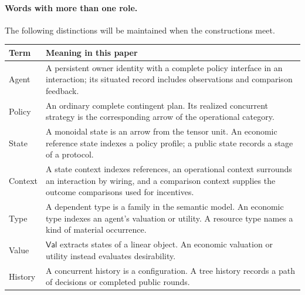 \documentclass[11pt,a4paper]{article}
\numberwithin{equation}{section}
\theoremstyle{definition}
\theoremstyle{remark}
\theoremstyle{plain}
\begin{document}
\paragraph{Words with more than one role.}
The following distinctions will be maintained when the constructions meet.
\begin{center}
\begin{tabular}{@{}p{}p{}@{}}
\toprule
Term & Meaning in this paper\\
\midrule
Agent & A persistent owner identity with a complete policy interface in an
interaction; its situated record includes observations and comparison feedback.\\
Policy & An ordinary complete contingent plan. Its realized concurrent strategy
is the corresponding arrow of the operational category.\\
State & A monoidal state is an arrow from the tensor unit.
An economic reference state indexes a policy profile; a public state
records a stage of a protocol.\\
Context & A state context indexes references, an operational context
surrounds an interaction by wiring, and a comparison context supplies
the outcome comparisons used for incentives.\\
Type & A dependent type is a family in the semantic model.
An economic type indexes an agent's valuation or utility.
A resource type names a kind of material occurrence.\\
Value & $\mathsf{Val}$ extracts states of a linear object.
An economic valuation or utility instead evaluates desirability.\\
History & A concurrent history is a configuration.
A tree history records a path of decisions or completed public rounds.\\
\bottomrule
\end{tabular}
\end{center}
\end{document}
